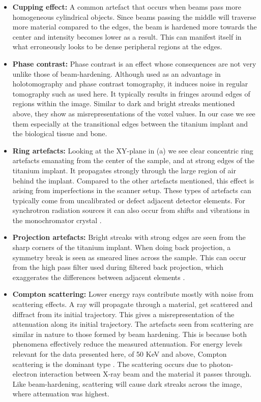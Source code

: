 \begin{itemize}
\item \textbf{Cupping effect:} A common artefact that occurs when beams pass more homogeneous
cylindrical objects. Since beams passing the middle will traverse more material compared to the
edges, the beam is hardened more towards the center and intensity becomes lower as a result. This
can manifest itself in what erroneously looks to be dense peripheral regions at the edges.

\item \textbf{Phase contrast:} Phase contrast is an effect whose consequences are not very unlike those
of beam-hardening.  Although used as an advantage in holotomography\citep{holotomography} and phase
contrast tomography\citep{phasecontrast}, it induces noise in regular tomography such as used here.
It typically results in fringes around edges of regions within the image\citep{srnoise}. Similar to
dark and bright streaks mentioned above, they show as misrepresentations of the voxel values. In our
case we see them especially at the transitional edges between the titanium implant and the
biological tissue and bone.

\item \textbf{Ring artefacts:} Looking at the XY-plane in (a) we see clear concentric ring
artefacts emanating from the center of the sample, and at strong edges of the titanium implant. It
propagates strongly through the large region of air behind the implant. Compared to the other
artefacts mentioned, this effect is arising from imperfections in the scanner setup. These types of
artefacts can typically come from uncalibrated or defect adjacent detector elements. For synchrotron
radiation sources it can also occur from shifts and vibrations in the monochromator crystal
\citep{ringartefacts}.

\item \textbf{Projection artefacts:} Bright streaks with strong edges are seen from the sharp corners of
the titanium implant. When doing back projection, a symmetry break is seen as smeared lines across
the sample. This can occur from the high pass filter used during filtered back projection, which
exaggerates the differences between adjacent elements \citep{ctnoise}.

\item \textbf{Compton scattering:} Lower energy rays contribute mostly with noise from scattering
effects. A ray will propagate through a material, get scattered and diffract from its initial
trajectory. This gives a misrepresentation of the attenuation along its initial trajectory. The
artefacts seen from scattering are similar in nature to those formed by beam hardening. This is
because both phenomena effectively reduce the measured attenuation. For energy levels relevant for
the data presented here, of 50 KeV and above, Compton scattering is the dominant type
\citep{Compton}.  The scattering occurs due to photon-electron interaction between X-ray beam and
the material it passes through. Like beam-hardening, scattering will cause dark streaks across the
image, where attenuation was highest.
\end{itemize}

